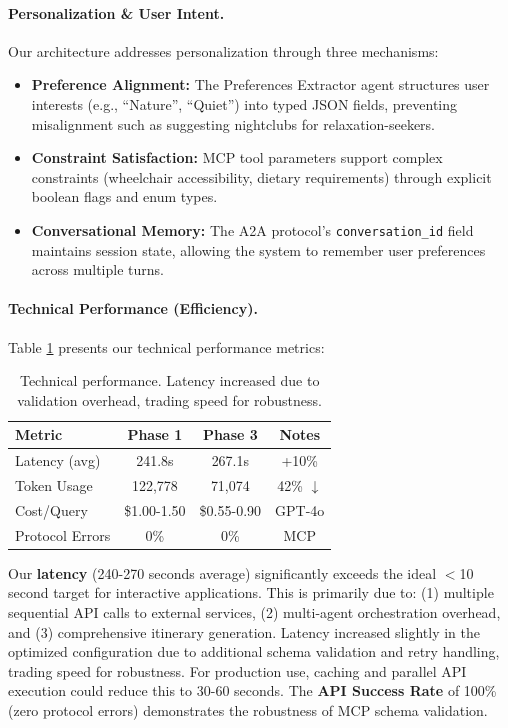 \documentclass[10pt,twocolumn]{article}
\begin{document}
\paragraph{Personalization \& User Intent.}
Our architecture addresses personalization through three mechanisms:
\begin{itemize}
    \item \textbf{Preference Alignment:} The Preferences Extractor agent structures user interests (e.g., ``Nature'', ``Quiet'') into typed JSON fields, preventing misalignment such as suggesting nightclubs for relaxation-seekers.
    \item \textbf{Constraint Satisfaction:} MCP tool parameters support complex constraints (wheelchair accessibility, dietary requirements) through explicit boolean flags and enum types.
    \item \textbf{Conversational Memory:} The A2A protocol's \texttt{conversation\_id} field maintains session state, allowing the system to remember user preferences across multiple turns.
\end{itemize}

\FloatBarrier
\paragraph{Technical Performance (Efficiency).}
Table \ref{tab:technical_perf} presents our technical performance metrics:

\begin{table}[!htbp]
\centering
\small
\begin{tabular}{lccc}
\toprule
\textbf{Metric} & \textbf{Phase 1} & \textbf{Phase 3} & \textbf{Notes} \\
\midrule
Latency (avg) & 241.8s & 267.1s & +10\% \\
Token Usage & 122,778 & 71,074 & 42\% $\downarrow$ \\
Cost/Query & \$1.00-1.50 & \$0.55-0.90 & GPT-4o \\
Protocol Errors & 0\% & 0\% & MCP \\
\bottomrule
\end{tabular}
\caption{Technical performance. Latency increased due to validation overhead, trading speed for robustness.}
\label{tab:technical_perf}
\end{table}

Our \textbf{latency} (240-270 seconds average) significantly exceeds the ideal $<$10 second target for interactive applications. This is primarily due to: (1) multiple sequential API calls to external services, (2) multi-agent orchestration overhead, and (3) comprehensive itinerary generation. Latency increased slightly in the optimized configuration due to additional schema validation and retry handling, trading speed for robustness. For production use, caching and parallel API execution could reduce this to 30-60 seconds. The \textbf{API Success Rate} of 100\% (zero protocol errors) demonstrates the robustness of MCP schema validation.
\end{document}

